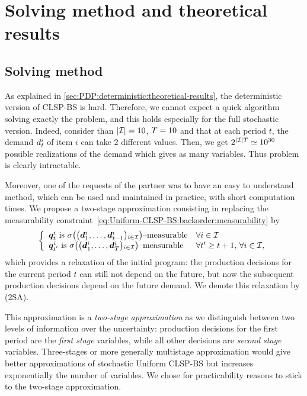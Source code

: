 \section{Solving method and theoretical results}


\subsection{Solving method}
\label{sec:PDP:stochastic:solving-method:solving-method}

As explained in \cref{sec:PDP:deterministic:theoretical-results}, the deterministic version of CLSP-BS is hard.
Therefore, we cannot expect a quick algorithm solving exactly the problem, and this holds especially for the full stochastic version.
Indeed, consider than $\card{\REF}=10$, $T=10$ and that at each period $t$, the demand $d_t^i$ of item $i$ can take 2 different values.
Then, we get $2^{\card{\REF}\horizon}\simeq10^{30}$ possible realizations of the demand which gives as many variables.
Thus problem is clearly intractable.


Moreover, one of the requests of the partner was to have an easy to understand method, which can be used and maintained in practice, with short computation times.
We propose a two-stage approximation consisting in replacing the measurability constraint~\eqref{eq:Uniform-CLSP-BS:backorder:measurability} by
\begin{equation}
\left\{
\begin{array}{l@{\quad}l}
\va\quantity_{t}^i\ \mbox{is}\ \Sfield{\bracket{\va\demand_1^i,\ldots,\va\demand_{t-1}^i}_{i\in\REF}}\mbox{--measurable}& \forall i\in\REF
\\
\va\quantity_{t'}^i\ \mbox{is}\ \Sfield{\bracket{\va\demand_1^i,\ldots,\va\demand_{\horizon}^i}_{i\in\REF}}\mbox{--measurable}& \forall t'\geq t+1,\, \forall i\in\REF,
\end{array}
\right.
\end{equation}
which provides a relaxation of the initial program: the production decisions for the current period $t$ can still not depend on the future, but now the subsequent production decisions depend on the future demand.
We denote this relaxation by (2SA).


This approximation is a \emph{two-stage approximation} as we distinguish between two levels of information over the uncertainty: production decisions for the first period are the \emph{first stage} variables, while all other decisions are \emph{second stage} variables.
Three-stages or more generally multistage approximation would give better approximations of stochastic Uniform CLSP-BS but increases exponentially the number of variables.
We chose for practicability reasons to stick to the two-stage approximation.


